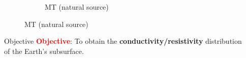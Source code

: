\begin{frame}
\begin{figure}
\begin{subfigure}[b]{0.4\textwidth}
            \caption{MT (natural source)}
        \end{subfigure}
    \end{figure}
    \vfill
    \begin{block}{Objective}
        \centering
        \textbf{\textcolor{red}{Objective}}: To obtain the \textbf{conductivity/resistivity} distribution \\ of the Earth's subsurface.
    \end{block}

\end{frame}